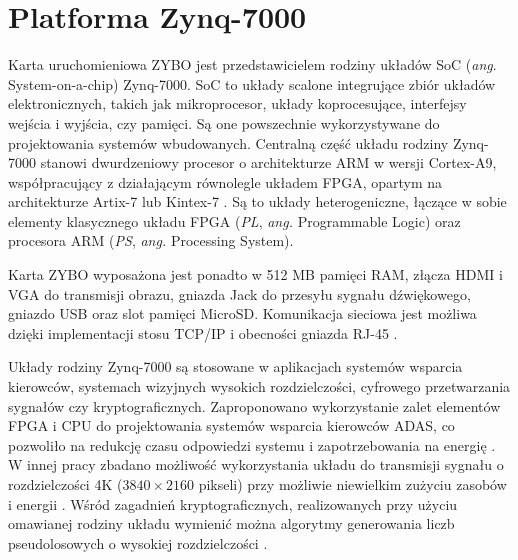 \chapter{Platforma Zynq-7000}
\label{cha:platform}

Karta uruchomieniowa ZYBO jest przedstawicielem rodziny układów SoC (\emph{ang}. System-on-a-chip) Zynq-7000. %
SoC to układy scalone integrujące zbiór układów elektronicznych, takich jak mikroprocesor, układy koprocesujące, interfejsy wejścia i wyjścia, czy pamięci. Są one powszechnie wykorzystywane do projektowania systemów wbudowanych. %
Centralną część układu rodziny Zynq-7000 stanowi dwurdzeniowy procesor o architekturze ARM w wersji Cortex-A9, współpracujący z działającym równolegle układem FPGA, opartym na architekturze Artix-7 lub Kintex-7 \cite{zynq-homepage}. %
Są to układy heterogeniczne, łączące w sobie elementy klasycznego układu FPGA (\emph{PL}, \emph{ang.} Programmable Logic) oraz procesora ARM (\emph{PS}, \emph{ang.} Processing System). %

Karta ZYBO wyposażona jest ponadto w 512 MB pamięci RAM, złącza HDMI i VGA do transmisji obrazu, gniazda Jack do przesyłu sygnału dźwiękowego, gniazdo USB oraz slot pamięci MicroSD. %
Komunikacja sieciowa jest możliwa dzięki implementacji stosu TCP/IP i obecności gniazda RJ-45 \cite{zynq-datasheet}.

Układy rodziny Zynq-7000 są stosowane w aplikacjach systemów wsparcia kierowców, systemach wizyjnych wysokich rozdzielczości, cyfrowego przetwarzania sygnałów czy kryptograficznych. Zaproponowano wykorzystanie zalet elementów FPGA i CPU do projektowania systemów wsparcia kierowców ADAS, co pozwoliło na redukcję czasu odpowiedzi systemu i zapotrzebowania na energię \cite{GuanwenZhong}.
W innej pracy zbadano możliwość wykorzystania układu do transmisji sygnału o rozdzielczości 4K ($3840 \times 2160$ pikseli) przy możliwie niewielkim zużyciu zasobów i energii \cite{MaleenAbeydeera}.
Wśród zagadnień kryptograficznych, realizowanych przy użyciu omawianej rodziny układu wymienić można algorytmy generowania liczb pseudolosowych o wysokiej rozdzielczości	\cite{PawelDabal2014}. %

